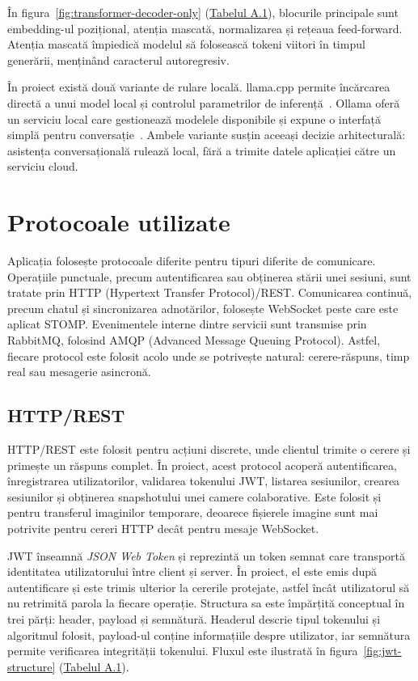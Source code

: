 În figura~\ref{fig:transformer-decoder-only} (\hyperref[tab:surse-figuri-ai]{Tabelul A.1}), blocurile principale sunt embedding-ul pozițional, atenția mascată, normalizarea și rețeaua feed-forward.
Atenția mascată împiedică modelul să folosească tokeni viitori în timpul generării, menținând caracterul autoregresiv.

În proiect există două variante de rulare locală.
llama.cpp permite încărcarea directă a unui model local și controlul parametrilor de inferență~\cite{llamacpp2026}.
Ollama oferă un serviciu local care gestionează modelele disponibile și expune o interfață simplă pentru conversație~\cite{ollama2026}.
Ambele variante susțin aceeași decizie arhitecturală: asistența conversațională rulează local, fără a trimite datele aplicației către un serviciu cloud.

\section{Protocoale utilizate}
\label{sec:protocoale-utilizate}

Aplicația folosește protocoale diferite pentru tipuri diferite de comunicare.
Operațiile punctuale, precum autentificarea sau obținerea stării unei sesiuni, sunt tratate prin HTTP (Hypertext Transfer Protocol)/REST.
Comunicarea continuă, precum chatul și sincronizarea adnotărilor, folosește WebSocket peste care este aplicat STOMP.
Evenimentele interne dintre servicii sunt transmise prin RabbitMQ, folosind AMQP (Advanced Message Queuing Protocol).
Astfel, fiecare protocol este folosit acolo unde se potrivește natural: cerere-răspuns, timp real sau mesagerie asincronă.

\subsection{HTTP/REST}
\label{subsec:http-rest}

HTTP/REST este folosit pentru acțiuni discrete, unde clientul trimite o cerere și primește un răspuns complet.
În proiect, acest protocol acoperă autentificarea, înregistrarea utilizatorilor, validarea tokenului JWT, listarea sesiunilor, crearea sesiunilor și obținerea snapshotului unei camere colaborative.
Este folosit și pentru transferul imaginilor temporare, deoarece fișierele imagine sunt mai potrivite pentru cereri HTTP decât pentru mesaje WebSocket.

JWT înseamnă \textit{JSON Web Token} și reprezintă un token semnat care transportă identitatea utilizatorului între client și server.
În proiect, el este emis după autentificare și este trimis ulterior la cererile protejate, astfel încât utilizatorul să nu retrimită parola la fiecare operație.
Structura sa este împărțită conceptual în trei părți: header, payload și semnătură.
Headerul descrie tipul tokenului și algoritmul folosit, payload-ul conține informațiile despre utilizator, iar semnătura permite verificarea integrității tokenului.
Fluxul este ilustrată în figura~\ref{fig:jwt-structure} (\hyperref[tab:surse-figuri-ai]{Tabelul A.1}).


